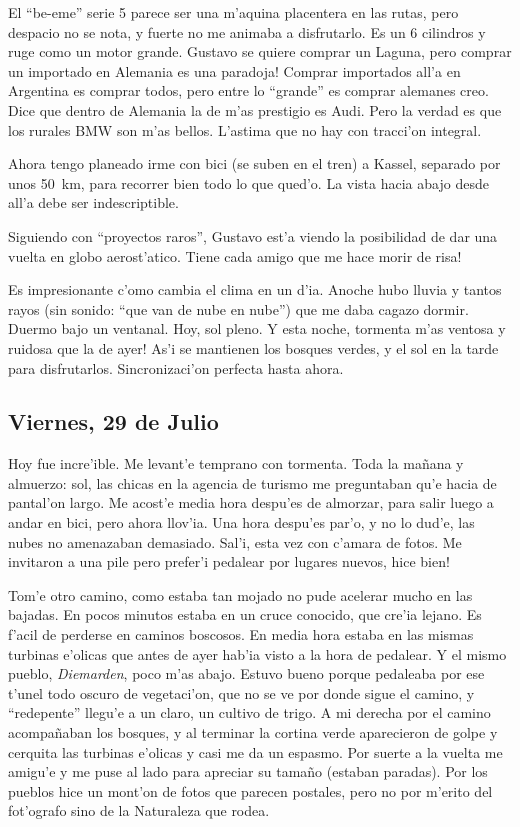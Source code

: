 El ``be-eme'' serie 5 parece ser una m'aquina placentera en las rutas, pero
despacio no se nota, y fuerte no me animaba a disfrutarlo. Es un 6 cilindros y
ruge como un motor grande. Gustavo se quiere comprar un Laguna, \textexclamdown
pero comprar un importado en Alemania es una paradoja! Comprar importados all'a
en Argentina es comprar todos, pero entre lo ``grande'' es comprar alemanes
creo. Dice que dentro de Alemania la de m'as prestigio es Audi. Pero la verdad
es que los rurales {\small BMW} son m'as bellos. L'astima que no hay con
tracci'on integral.

Ahora tengo planeado irme con bici (se suben en el tren) a Kassel, separado por
unos 50~km, para recorrer bien todo lo que qued'o. La vista hacia abajo desde
all'a debe ser indescriptible.

Siguiendo con ``proyectos raros'', Gustavo est'a viendo la posibilidad de dar
una vuelta en globo aerost'atico. \textexclamdown Tiene cada amigo que me hace
morir de risa!

Es impresionante c'omo cambia el clima en un d'ia. Anoche hubo lluvia y tantos
rayos (sin sonido: ``que van de nube en nube'') que me daba cagazo dormir.
Duermo bajo un ventanal. Hoy, sol pleno. Y esta noche, \textexclamdown tormenta
m'as ventosa y ruidosa que la de ayer! As'i se mantienen los bosques verdes, y
el sol en la tarde para disfrutarlos. Sincronizaci'on perfecta hasta ahora.

\subsection*{Viernes, 29 de Julio}

Hoy fue incre'ible. Me levant'e temprano con tormenta. Toda la ma\~nana y
almuerzo: sol, las chicas en la agencia de turismo me preguntaban qu'e hacia de
pantal'on largo. Me acost'e media hora despu'es de almorzar, para salir luego a
andar en bici, pero ahora llov'ia. Una hora despu'es par'o, y no lo dud'e, las
nubes no amenazaban demasiado. Sal'i, esta vez con c'amara de fotos. Me
invitaron a una pile pero prefer'i pedalear por lugares nuevos, \textexclamdown
hice bien!

Tom'e otro camino, como estaba tan mojado no pude acelerar mucho en las bajadas.
En pocos minutos estaba en un cruce conocido, que cre'ia lejano. Es f'acil de
perderse en caminos boscosos. En media hora estaba en las mismas turbinas
e'olicas que antes de ayer hab'ia visto a la hora de pedalear. Y el mismo
pueblo, \emph{Diemarden}, poco m'as abajo. Estuvo bueno porque pedaleaba por ese
t'unel todo oscuro de vegetaci'on, que no se ve por donde sigue el camino, y
``redepente'' llegu'e a un claro, un cultivo de trigo. A mi derecha por el
camino acompa\~naban los bosques, y al terminar la cortina verde aparecieron de
golpe y cerquita las turbinas e'olicas y casi me da un espasmo. Por suerte a la
vuelta me amigu'e y me puse al lado para apreciar su tama\~no (estaban paradas).
Por los pueblos hice un mont'on de fotos que parecen postales, pero no por
m'erito del fot'ografo sino de la Naturaleza que rodea.

